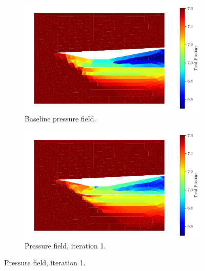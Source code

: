 \pagebreak
\begin{figure}[h!]\ContinuedFloat
    \centering
    \begin{subfigure}[h]{0.49\linewidth}
        \centering
        \includegraphics[width=\linewidth]{rep/q4/Pfield0.pdf}
        \caption{Baseline pressure field.}\label{fig:pfield0}
    \end{subfigure}
    \begin{subfigure}[h]{0.49\linewidth}
        \centering
        \includegraphics[width=\linewidth]{rep/q4/Pfield1.pdf}
        \caption{Pressure field, iteration 1.}
    \end{subfigure}


\end{figure}
